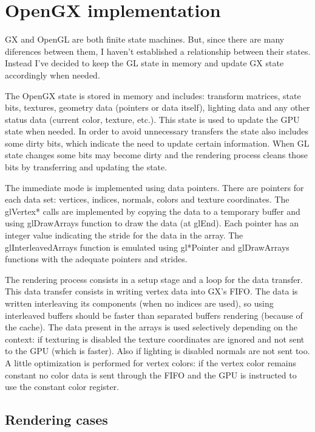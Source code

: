 \documentclass[12pt]{article}
\newcommand{\fname}[1] {{\color{blue}#1}}
\begin{document}
\section{OpenGX implementation}

GX and OpenGL are both finite state machines. But, since there are many diferences between them, I haven't established a relationship between their states. Instead I've decided to keep the GL state in memory and update GX state accordingly when needed.

The OpenGX state is stored in memory and includes: transform matrices, state bits, textures, geometry data (pointers or data itself), lighting data and any other status data (current color, texture, etc.). This state is used to update the GPU state when needed. In order to avoid unnecessary transfers the state also includes some dirty bits, which indicate the need to update certain information. When GL state changes some bits may become dirty and the rendering process cleans those bits by transferring and updating the state.

The immediate mode is implemented using data pointers. There are pointers for each data set: vertices, indices, normals, colors and texture coordinates. The \fname{glVertex*} calls are implemented by copying the data to a temporary buffer and using \fname{glDrawArrays} function to draw the data (at \fname{glEnd}). Each pointer has an integer value indicating the stride for the data in the array. The \fname{glInterleavedArrays} function is emulated using \fname{gl*Pointer} and \fname{glDrawArrays} functions with the adequate pointers and strides.

The rendering process consists in a setup stage and a loop for the data transfer. This data transfer consists in writing vertex data into GX's FIFO. The data is written interleaving its components (when no indices are used), so using interleaved buffers should be faster than separated buffers rendering (because of the cache). The data present in the arrays is used selectively depending on the context: if texturing is disabled the texture coordinates are ignored and not sent to the GPU (which is faster). Also if lighting is disabled normals are not sent too. A little optimization is performed for vertex colors: if the vertex color remains constant no color data is sent through the FIFO and the GPU is instructed to use the constant color register.

\subsection{Rendering cases}
\end{document}
